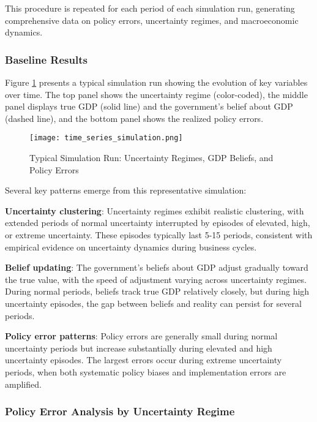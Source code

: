 \documentclass[5p,authoryear]{elsarticle}
\begin{document}
This procedure is repeated for each period of each simulation run, generating comprehensive data on policy errors, uncertainty regimes, and macroeconomic dynamics.

\subsubsection{Baseline Results}

Figure \ref{fig:time_series} presents a typical simulation run showing the evolution of key variables over time. The top panel shows the uncertainty regime (color-coded), the middle panel displays true GDP (solid line) and the government's belief about GDP (dashed line), and the bottom panel shows the realized policy errors.

\begin{figure}[h!]
\centering
\texttt{[image: time\_series\_simulation.png]}
\caption{Typical Simulation Run: Uncertainty Regimes, GDP Beliefs, and Policy Errors}
\label{fig:time_series}
\end{figure}

Several key patterns emerge from this representative simulation:

\textbf{Uncertainty clustering}: Uncertainty regimes exhibit realistic clustering, with extended periods of normal uncertainty interrupted by episodes of elevated, high, or extreme uncertainty. These episodes typically last 5-15 periods, consistent with empirical evidence on uncertainty dynamics during business cycles.

\textbf{Belief updating}: The government's beliefs about GDP adjust gradually toward the true value, with the speed of adjustment varying across uncertainty regimes. During normal periods, beliefs track true GDP relatively closely, but during high uncertainty episodes, the gap between beliefs and reality can persist for several periods.

\textbf{Policy error patterns}: Policy errors are generally small during normal uncertainty periods but increase substantially during elevated and high uncertainty episodes. The largest errors occur during extreme uncertainty periods, when both systematic policy biases and implementation errors are amplified.

\subsubsection{Policy Error Analysis by Uncertainty Regime}
\end{document}
